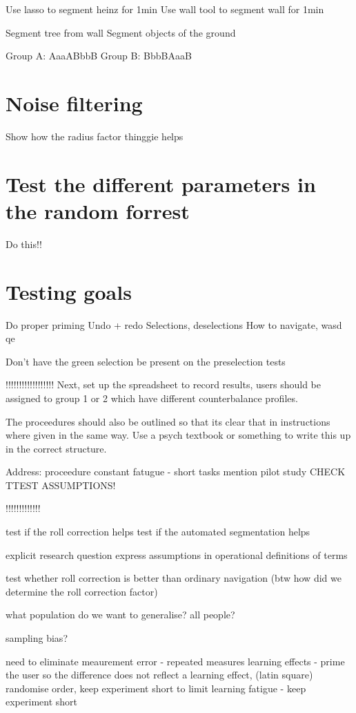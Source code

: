 Use lasso to segment heinz for 1min
Use wall tool to segment wall for 1min

Segment tree from wall
Segment objects of the ground

Group A: AaaABbbB
Group B: BbbBAaaB


\section{Noise filtering}

Show how the radius factor thinggie helps

\section{Test the different parameters in the random forrest}

Do this!!

\section{Testing goals}

Do proper priming
Undo + redo
Selections, deselections
How to navigate, wasd qe

Don't have the green selection be present on the preselection tests


!!!!!!!!!!!!!!!!!!
Next, set up the spreadsheet to record results, users should be assigned to group 1 or 2 which have different counterbalance profiles.

The proceedures should also be outlined so that its clear that in instructions where given in the same way. Use a psych textbook or something to write this up in the correct structure.

Address:
proceedure constant
fatugue - short tasks
mention pilot study
CHECK TTEST ASSUMPTIONS!

!!!!!!!!!!!!!


test if the roll correction helps
test if the automated segmentation helps


explicit research question
express assumptions in operational definitions of terms

test whether roll correction is better than ordinary navigation
(btw how did we determine the roll correction factor)

what population do we want to generalise?
all people?

sampling bias?

need to eliminate meaurement error - repeated measures
learning effects - prime the user so the difference does not reflect a learning effect, (latin square) randomise order, keep experiment short to limit learning
fatigue - keep experiment short

